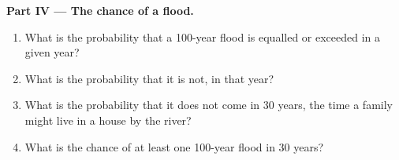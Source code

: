 \begin{problem}
\medskip
\noindent\textbf{Part IV --- The chance of a flood.}
\begin{enumerate}[resume]
  \item What is the probability that a \num{100}-year flood is equalled or
        exceeded in a given year?
  \item What is the probability that it is not, in that year?
  \item What is the probability that it does not come in \num{30} years,
        the time a family might live in a house by the river?
  \item What is the chance of at least one \num{100}-year flood in
        \num{30} years?
\end{enumerate}
\end{problem}
